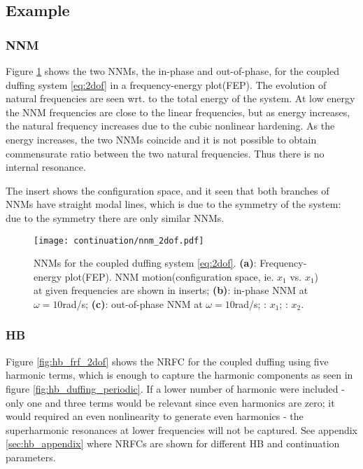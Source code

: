 \subsection{Example}
\label{sec:cont_example}

\subsubsection{NNM}

Figure \ref{fig:nnm_2dof} shows the two NNMs, the in-phase and out-of-phase, for
the coupled duffing system \eqref{eq:2dof} in a frequency-energy plot(FEP).
The evolution of natural frequencies are seen wrt. to the total energy of the
system. At low energy the NNM frequencies are close to the linear frequencies,
but as energy increases, the natural frequency increases due to the cubic
nonlinear hardening. As the energy increases, the two NNMs coincide and it is
not possible to obtain commensurate ratio between the two natural frequencies.
Thus there is no internal resonance.

The insert shows the configuration space, and it seen that both branches of NNMs
have straight modal lines, which is due to the symmetry of the system: due to
the symmetry there are only similar NNMs.


\begin{figure}[!ht]
  \centering
  \texttt{[image: continuation/nnm\_2dof.pdf]}
  \caption{NNMs for the coupled duffing system \eqref{eq:2dof}.
    \textbf{(a)}: Frequency-energy plot(FEP). NNM motion(configuration space,
    ie. $x_1$ vs. $x_1$) at given frequencies are shown in inserts;
    \textbf{(b)}: in-phase NNM at $\omega=10$rad/s;
    \textbf{(c)}: out-of-phase NNM at $\omega=10$rad/s;
    \sampleline{}: $x_1$;
    \textcolor{orange}{}: $x_2$.
  }
  \label{fig:nnm_2dof}
 \end{figure}


\subsubsection{HB}

Figure \ref{fig:hb_frf_2dof} shows the NRFC for the coupled duffing using five
harmonic terms, which is enough to capture the harmonic components as seen in
figure \ref{fig:hb_duffing_periodic}.
If a lower number of harmonic were
included - only one and three terms would be relevant since even harmonics are
zero; it would required an even nonlinearity to generate even harmonics - the
superharmonic resonances at lower frequencies will not be captured. See appendix
\ref{sec:hb_appendix} where NRFCs are shown for different HB and continuation
parameters.


